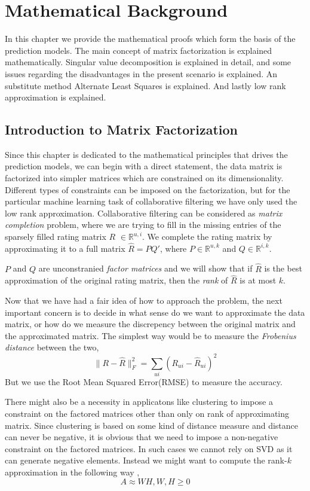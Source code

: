 \chapter{Mathematical Background}

\textsf{ In this chapter we provide the mathematical proofs which form the basis
of the prediction models. The main concept of matrix factorization is explained
mathematically. Singular value decomposition is explained in detail, and some
issues regarding the disadvantages in the present scenario is explained. An
substitute method Alternate Least Squares is explained. And lastly low rank
approximation is explained.}

\section{Introduction to Matrix Factorization}
Since this chapter is dedicated to the mathematical principles that drives the
prediction models, we can begin with a direct statement, the data matrix is
factorized into simpler matrices which are constrained on its dimensionality.
Different types of constraints can be imposed on the factorization, but for the
particular machine learning task of collaborative filtering we have only used
the low rank approximation. Collaborative filtering can be considered as
\emph{matrix completion} problem, where we are trying to fill in the missing
entries of the sparsely filled rating matrix $R$ $\in\mathbb{R}^{u,i}$. We
complete the rating matrix by approximating it to a full matrix $\hat{R}=PQ'$,
where $P \in\mathbb{R}^{u,k}$ and $Q \in\mathbb{R}^{i,k}$. 

$P$ and $Q$ are unconstranied \emph{factor matrices} and we will show that if
$\hat{R}$ is the best approximation of the original rating matrix, then the
\emph{rank} of $\hat{R}$ is at most $k$. 

Now that we have had a fair idea of how to approach the problem, the next
important concern is to decide in what sense do we want to approximate the data
matrix, or how do we measure the discrepency between the original matrix and the
approximated matrix. The simplest way would be to measure the \emph{Frobenius
distance} between the two,
\[
 \|{R-\hat{R}}\|_{F}^2 = \sum_{ui}^{}(R_{ui}-\hat{R}_{ui})^2
\]
But we use the Root Mean Squared Error(RMSE) to measure the accuracy. 

There might also be a necessity in applicatons like clustering to impose a
constraint on the factored matrices other than only on rank of approximating
matrix. Since clustering is based on some kind of distance measure and distance
can never be negative, it is obvious that we need to impose a non-negative
constraint on the factored matrices. In such cases we cannot rely on SVD as it
can generate negative elements. Instead we might want to compute the rank-$k$
approximation in the following way \cite{eld-mm:07}, \\
\[
  A\approx WH,		W,H\geq0
\] \\

